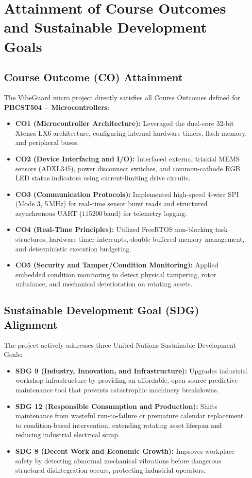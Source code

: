 \section{Attainment of Course Outcomes and Sustainable Development Goals}
\subsection{Course Outcome (CO) Attainment}
The VibeGuard micro project directly satisfies all Course Outcomes defined for \textbf{PBCST504 -- Microcontrollers}:
\begin{itemize}
    \item \textbf{CO1 (Microcontroller Architecture):} Leveraged the dual-core 32-bit Xtensa LX6 architecture, configuring internal hardware timers, flash memory, and peripheral buses.
    \item \textbf{CO2 (Device Interfacing and I/O):} Interfaced external triaxial MEMS sensors (ADXL345), power disconnect switches, and common-cathode RGB LED status indicators using current-limiting drive circuits.
    \item \textbf{CO3 (Communication Protocols):} Implemented high-speed 4-wire SPI (Mode 3, 5\,MHz) for real-time sensor burst reads and structured asynchronous UART ($115200$\,baud) for telemetry logging.
    \item \textbf{CO4 (Real-Time Principles):} Utilized FreeRTOS non-blocking task structures, hardware timer interrupts, double-buffered memory management, and deterministic execution budgeting.
    \item \textbf{CO5 (Security and Tamper/Condition Monitoring):} Applied embedded condition monitoring to detect physical tampering, rotor unbalance, and mechanical deterioration on rotating assets.
\end{itemize}

\subsection{Sustainable Development Goal (SDG) Alignment}
The project actively addresses three United Nations Sustainable Development Goals:
\begin{itemize}
    \item \textbf{SDG 9 (Industry, Innovation, and Infrastructure):} Upgrades industrial workshop infrastructure by providing an affordable, open-source predictive maintenance tool that prevents catastrophic machinery breakdowns.
    \item \textbf{SDG 12 (Responsible Consumption and Production):} Shifts maintenance from wasteful run-to-failure or premature calendar replacement to condition-based intervention, extending rotating asset lifespan and reducing industrial electrical scrap.
    \item \textbf{SDG 8 (Decent Work and Economic Growth):} Improves workplace safety by detecting abnormal mechanical vibrations before dangerous structural disintegration occurs, protecting industrial operators.
\end{itemize}

